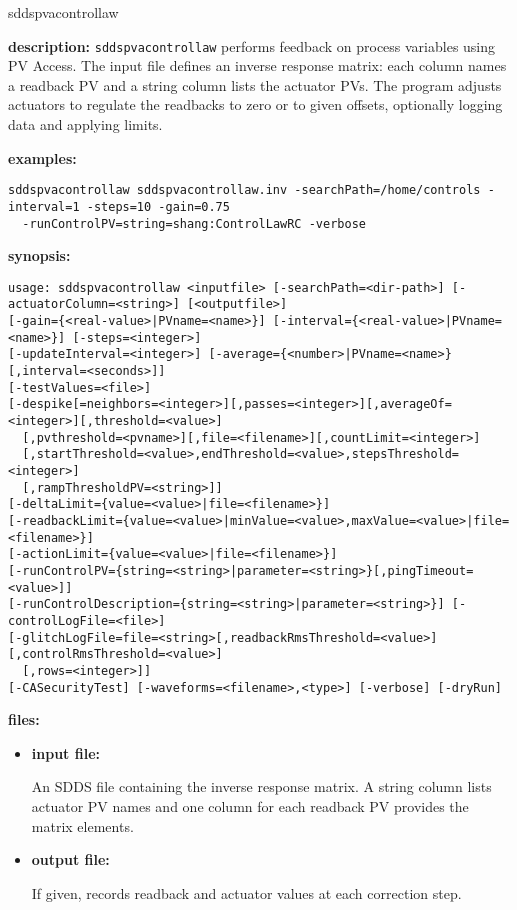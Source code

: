 %
\begin{sddsprog}{sddspvacontrollaw}
\item \textbf{description:}
\verb+sddspvacontrollaw+ performs feedback on process variables using PV Access. The
input file defines an inverse response matrix: each column names a readback PV and a
string column lists the actuator PVs. The program adjusts actuators to regulate the
readbacks to zero or to given offsets, optionally logging data and applying limits.

\item \textbf{examples:}
\begin{verbatim}
sddspvacontrollaw sddspvacontrollaw.inv -searchPath=/home/controls -interval=1 -steps=10 -gain=0.75 
  -runControlPV=string=shang:ControlLawRC -verbose
\end{verbatim}

\item \textbf{synopsis:}
\begin{verbatim}
usage: sddspvacontrollaw <inputfile> [-searchPath=<dir-path>] [-actuatorColumn=<string>] [<outputfile>]
[-gain={<real-value>|PVname=<name>}] [-interval={<real-value>|PVname=<name>}] [-steps=<integer>]
[-updateInterval=<integer>] [-average={<number>|PVname=<name>}[,interval=<seconds>]]
[-testValues=<file>]
[-despike[=neighbors=<integer>][,passes=<integer>][,averageOf=<integer>][,threshold=<value>]
  [,pvthreshold=<pvname>][,file=<filename>][,countLimit=<integer>]
  [,startThreshold=<value>,endThreshold=<value>,stepsThreshold=<integer>]
  [,rampThresholdPV=<string>]]
[-deltaLimit={value=<value>|file=<filename>}]
[-readbackLimit={value=<value>|minValue=<value>,maxValue=<value>|file=<filename>}]
[-actionLimit={value=<value>|file=<filename>}]
[-runControlPV={string=<string>|parameter=<string>}[,pingTimeout=<value>]]
[-runControlDescription={string=<string>|parameter=<string>}] [-controlLogFile=<file>]
[-glitchLogFile=file=<string>[,readbackRmsThreshold=<value>][,controlRmsThreshold=<value>]
  [,rows=<integer>]]
[-CASecurityTest] [-waveforms=<filename>,<type>] [-verbose] [-dryRun]
\end{verbatim}

\item \textbf{files:}
\begin{itemize}
  \item \textbf{input file:} \par
    An SDDS file containing the inverse response matrix. A string column lists actuator PV names and one column for each readback PV provides the matrix elements.
  \item \textbf{output file:} \par
    If given, records readback and actuator values at each correction step.
\end{itemize}


\end{sddsprog}
